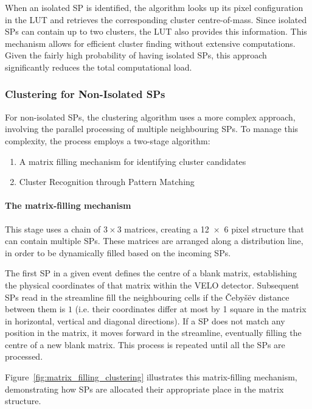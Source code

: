 When an isolated SP is identified, the algorithm looks up its pixel configuration in the LUT and retrieves the corresponding cluster centre-of-mass. Since isolated SPs can contain up to two clusters, the LUT also provides this information. This mechanism allows for efficient cluster finding without extensive computations. Given the fairly high probability of having isolated SPs, this approach significantly reduces the total computational load.

\subsubsection{Clustering for Non-Isolated SPs}
For non-isolated SPs, the clustering algorithm uses a more complex approach, involving the parallel processing of multiple neighbouring SPs. To manage this complexity, the process employs a two-stage algorithm\cite{Lazzari:2813167}:
\begin{enumerate}
    \item A matrix filling mechanism for identifying cluster candidates
    \item Cluster Recognition through Pattern Matching
\end{enumerate}

\paragraph{The matrix-filling mechanism}
This stage uses a chain of $3\times3$ matrices, creating a 12~×~6 pixel structure that can contain multiple SPs. These matrices are arranged along a distribution line, in order to be dynamically filled based on the incoming SPs.

The first SP in a given event defines the centre of a blank matrix, establishing the physical coordinates of that matrix within the VELO detector. Subsequent SPs read in the streamline fill the neighbouring cells if the Čebyšëv distance between them is $1$ (i.e. their coordinates differ at most by 1 square in the matrix in horizontal, vertical and diagonal directions). If a SP does not match any position in the matrix, it moves forward in the streamline, eventually filling the centre of a new blank matrix. This process is repeated until all the SPs are processed.

Figure~\ref{fig:matrix_filling_clustering} illustrates this matrix-filling mechanism, demonstrating how SPs are allocated their appropriate place in the matrix structure.

